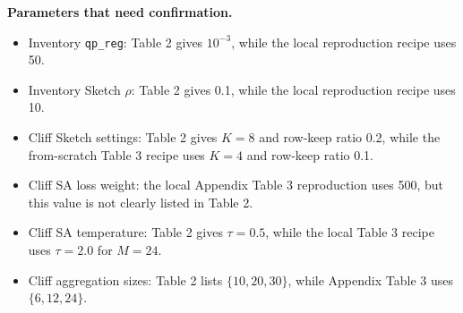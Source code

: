 \documentclass[10pt]{article}
\begin{document}
\vspace{8pt}
\small
\textbf{Parameters that need confirmation.}
\begin{itemize}[leftmargin=1.5em,itemsep=2pt,topsep=2pt]
    \item Inventory \texttt{qp\_reg}: Table 2 gives $10^{-3}$, while the local reproduction recipe uses 50.
    \item Inventory Sketch $\rho$: Table 2 gives 0.1, while the local reproduction recipe uses 10.
    \item Cliff Sketch settings: Table 2 gives $K=8$ and row-keep ratio 0.2, while the from-scratch Table 3 recipe uses $K=4$ and row-keep ratio 0.1.
    \item Cliff SA loss weight: the local Appendix Table 3 reproduction uses 500, but this value is not clearly listed in Table 2.
    \item Cliff SA temperature: Table 2 gives $\tau=0.5$, while the local Table 3 recipe uses $\tau=2.0$ for $M=24$.
    \item Cliff aggregation sizes: Table 2 lists $\{10,20,30\}$, while Appendix Table 3 uses $\{6,12,24\}$.
\end{itemize}
\end{document}
